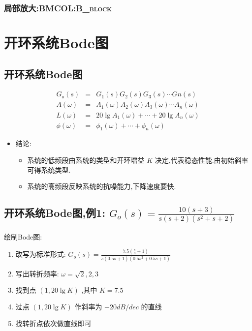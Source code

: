 \documentclass[table]{beamer}
\begin{document}
\subsubsection[局部放大:]{局部放大:\hfill{}\textsc{BMCOL:B\_block}}
\label{sec:orgfefe933}

\section{开环系统Bode图}
\label{sec:orgf6b7006}
\subsection{开环系统Bode图}
\label{sec:orgbd4ae1e}
\begin{eqnarray*}
G_o(s) &=  &G_1(s)G_2(s)G_3(s)\cdots Gn(s) \\
A(\omega) &=&A_1(\omega)A_2(\omega)A_3(\omega)\cdots A_n(\omega)\\
L(\omega) &=&20\lg A_1(\omega)+\cdots+20\lg A_n(\omega) \\
\phi(\omega) &=& \phi_1(\omega)+\cdots+\phi_n(\omega)
\end{eqnarray*}

\begin{itemize}
\item <2->结论:
\begin{itemize}
\item <2->系统的低频段由系统的类型和开环增益  \(K\)  决定,代表稳态性能.由初始斜率可得系统类型.
\item <3->系统的高频段反映系统的抗噪能力,下降速度要快.
\end{itemize}
\end{itemize}

\subsection{开环系统Bode图,例1: \(G_o(s)=\frac{10(s+3)}{s(s+2)(s^2+s+2)}\)}
\label{sec:orgb6d2cbe}
绘制Bode图:
\begin{enumerate}
\item <2->改写为标准形式:  \(G_o(s)=\frac{7.5(\frac{s}{3}+1)}{s(0.5s+1)(0.5s^2+0.5s+1)}\)
\item <3->写出转折频率:  \(\omega=\sqrt{2},2,3\)
\item <4->找到点  \((1,20\lg K)\)  ,其中 \(K=7.5\)
\item <5->过点  \((1,20\lg K)\)  作斜率为  \(-20dB/dec\)  的直线
\item <6->找转折点依次做直线即可
\end{enumerate}
\end{document}
